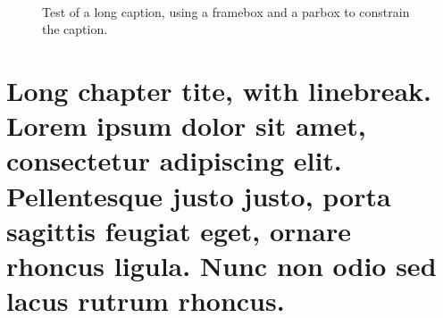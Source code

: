 \documentclass[letterpaper%
, twoside%
, 12pt%
,these%
, english%
,creativecommons,hyperref%
]{thETS}
\begin{document}
\cleardoublepage


\reversemarginpar


\begin{introduction}

  \lipsum[1] %

  \begin{figure}
    \centering %
    \\ \parbox{0.75\textwidth}{\caption{Test of a long caption, using a framebox and a parbox to constrain the caption.}\label{fig:vueEts}} %
  \end{figure}

  \lipsum[1] %


\end{introduction}



\chapter{Long chapter tite, with linebreak. Lorem ipsum dolor sit amet, consectetur adipiscing elit. Pellentesque justo justo, porta sagittis feugiat eget, ornare rhoncus ligula. Nunc non odio sed lacus rutrum rhoncus.}
\end{document}
